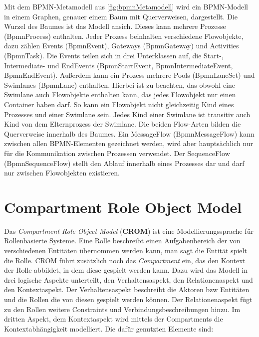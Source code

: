 Mit dem BPMN-Metamodell aus \cref{fig:bpmnMetamodell} wird ein BPMN-Modell in einem Graphen, genauer einem Baum mit Querverweisen, dargestellt.
Die Wurzel des Baumes ist das Modell ansich.
Dieses kann mehrere Prozesse (BpmnProcess) enthalten.
Jeder Prozess beinhalten verschiedene Flowobjekte, dazu zählen Events (BpmnEvent), Gateways (BpmnGateway) und Activities (BpmnTask).
Die Events teilen sich in drei Unterklassen auf, die Start-, Intermediate- und EndEvents (BpmnStartEvent, BpmnIntermediateEvent, BpmnEndEvent).
Außerdem kann ein Prozess mehrere Pools (BpmnLaneSet) und Swimlanes (BpmnLane) enthalten.
Hierbei ist zu beachten, das obwohl eine Swimlane auch Flowobjekte enthalten kann, das jedes Flowobjekt nur einen Container haben darf.
So kann ein Flowobjekt nicht gleichzeitig Kind eines Prozesses und einer Swimlane sein.
Jedes Kind einer Swimlane ist transitiv auch Kind von dem Elternprozess der Swimlane.
Die beiden Flow-Arten bilden die Querverweise innerhalb des Baumes.
Ein MessageFlow (BpmnMessageFlow) kann zwischen allen BPMN-Elementen gezeichnet werden, wird aber hauptsächlich nur für die Kommunikation zwischen Prozessen verwendet.
Der SequenceFlow (BpmnSequenceFlow) stellt den Ablauf innerhalb eines Prozesses dar und darf nur zwischen Flowobjekten existieren.

\section{Compartment Role Object Model}

Das \emph{Compartment Role Object Model} (\textbf{CROM}) ist eine Modellierungssprache für Rollenbasierte Systeme.
Eine Rolle beschreibt einen Aufgabenbereich der von verschiedenen Entitäten übernommen werden kann, man sagt die Entität spielt die Rolle.
CROM führt zusätzlich noch das \emph{Compartment} ein, das den Kontext der Rolle abbildet, in dem diese gespielt werden kann.
Dazu wird das Modell in drei logische Aspekte unterteilt, den Verhaltensaspekt, den Relationenaspekt und den Kontextaspekt.
Der Verhaltensaspekt beschreibt die Aktoren bzw Entitäten und die Rollen die von diesen gespielt werden können.
Der Relationenaspekt fügt zu den Rollen weitere Constraints und Verbindungsbeschreibungen hinzu.
Im dritten Aspekt, dem Kontextaspekt wird mittels der Compartments die Kontextabhängigkeit modelliert.
Die dafür genutzten Elemente sind:

